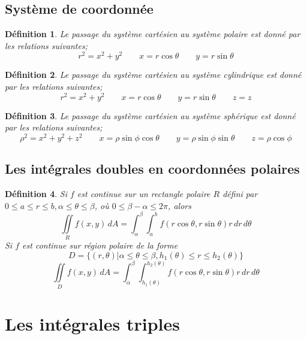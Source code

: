 \documentclass{article}[babel]
\newtheorem{mydef}{Définition}
\begin{document}
	\subsection{Système de coordonnée}
		\begin{mydef}
			Le passage du système cartésien au système polaire est donné par les relations suivantes;
				\[r^2=x^2+y^2\qquad x=r\cos\theta\qquad y=r\sin\theta\]
		\end{mydef}
		\begin{mydef}
			Le passage du système cartésien au système cylindrique est donné par les relations suivantes;
			\[r^2=x^2+y^2\qquad x=r\cos\theta\qquad y=r\sin\theta\qquad z=z\]
		\end{mydef}
		\begin{mydef}
	Le passage du système cartésien au système sphérique est donné par les relations suivantes;
	\[\rho^2=x^2+y^2+z^2\qquad x=\rho\sin\phi\cos\theta\qquad y=\rho\sin\phi\sin\theta\qquad z=\rho\cos\phi\]
\end{mydef}
	\subsection{Les intégrales doubles en coordonnées polaires}
		\begin{mydef}
		Si $f$ est continue sur un rectangle polaire $R$ défini par $0\leq a\leq r\leq b,\alpha\leq\theta\leq\beta$, où $0\leq\beta -\alpha \leq 2\pi$, alors \[\iint\limits_R f(x,y)\, dA=\int_{\alpha}^{\beta}\int_a^b f(r\cos\theta,r\sin\theta)r\,dr\, d\theta\]
		Si $f$ est continue sur région polaire de la forme \[D=\big\{ (r,\theta)\lvert \alpha\leq\theta\leq\beta, h_1(\theta)\leq r \leq h_2(\theta) \big\}\]
		\[\iint\limits_D f(x,y)\, dA = \int_{\alpha}^{\beta}\int_{h_1(\theta)}^{h_2(\theta)} f(r\cos\theta,r\sin\theta)r\, dr\, d \theta\]
	\end{mydef}
\section{Les intégrales triples}
\end{document}
